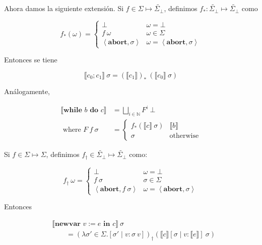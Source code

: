 \documentclass[article, 12pt]{article}
\begin{document}
Ahora damos la siguiente extensión. Si $f \in \Sigma \mapsto \widetilde{
\Sigma_\bot  } $, definimos $f_* :
\widetilde{ \Sigma_\bot  } \mapsto \widetilde{ \Sigma_\bot  }$ como

\begin{equation*}
  f_*(\omega) = \begin{cases}
    \bot  & \omega = \bot  \\ 
    f ~ \omega & \omega \in \Sigma \\ 
    \left<\textbf{abort}, \sigma \right> & \omega = \left<\textbf{abort}, \sigma \right>
  \end{cases}
\end{equation*}

Entonces se tiene

\begin{equation*}
  \llbracket c_0;c_1 \rrbracket ~ \sigma = \left( \llbracket c_1 \rrbracket
  \right)_{*} ~ \left( \llbracket c_0 \rrbracket ~ \sigma\right) 
\end{equation*}

Análogamente,

\begin{align*}
  \llbracket \textbf{while } b \textbf{ do } c \rrbracket &= \bigsqcup_{i \in
  \mathbb{N}} F^i ~ \bot  \\ 
    \text{ where } F ~ f ~ \sigma &= \begin{cases}
    f_{*}(\llbracket c \rrbracket ~ \sigma) & \llbracket b \rrbracket \\ 
    \sigma & \text{otherwise}
  \end{cases}
\end{align*}


Si $f \in \Sigma \mapsto \Sigma$, definimos $f_\dagger \in \widetilde{
\Sigma_\bot  } \mapsto \widetilde{ \Sigma_\bot  } $ como:

\begin{equation*}
  f_\dagger ~ \omega = \begin{cases}
    \bot  & \omega = \bot  \\ 
    f ~ \sigma & \sigma \in \Sigma \\ 
    \left<\textbf{abort}, f ~ \sigma \right> & \omega = \left<\textbf{abort}, \sigma \right>
  \end{cases}
\end{equation*}

Entonces

\begin{align*}
  &\llbracket \textbf{newvar } v := e \textbf{ in } c\rrbracket ~ \sigma \\ 
  &\qquad = \left( \lambda \sigma' \in \Sigma . [\sigma' \mid v : \sigma ~ v]
  \right)_{\dagger} \left( \llbracket c \rrbracket [\sigma \mid v : \llbracket e
  \rrbracket] ~ \sigma \right) 
\end{align*}
\end{document}
